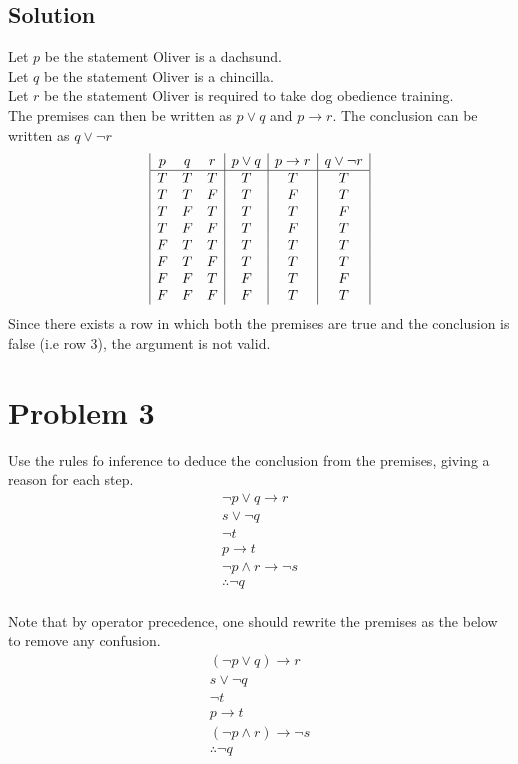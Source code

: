 \documentclass[table]{article}
\begin{document}
\subsection{Solution}
Let $p$ be the statement Oliver is a dachsund.\\
Let $q$ be the statement Oliver is a chincilla.\\
Let $r$ be the statement Oliver is required to take dog obedience training.\\
The premises can then be written as $p \lor q$ and $p \rightarrow r$. The conclusion can be written as $q \lor \neg r$
\begin{displaymath}
\begin{array}{|c c c|c|c|c|}
p & q & r & p \lor q & p \rightarrow r & q \lor \neg r\\
\hline
T & T & T & T & T & T\\
T & T & F & T & F & T\\
T & F & T & T & T & F\\
T & F & F & T & F & T\\
F & T & T & T & T & T\\
F & T & F & T & T & T\\
F & F & T & F & T & F\\
F & F & F & F & T & T\\
\end{array}
\end{displaymath}
Since there exists a row in which both the premises are true and the conclusion is false (i.e row 3), the argument is not valid.
\section{Problem 3}
Use the rules fo inference to deduce the conclusion from the premises, giving a reason for each step.
\begin{gather*}
\neg p \lor q \rightarrow r\\
s \lor \neg q\\
\neg t\\
p \rightarrow t\\
\neg p \land r \rightarrow \neg s\\
\therefore \neg q
\end{gather*}\\
Note that by operator precedence, one should rewrite the premises as the below to remove any confusion.
\begin{gather*}
(\neg p \lor q) \rightarrow r\\
s \lor \neg q\\
\neg t\\
p \rightarrow t\\
(\neg p \land r) \rightarrow \neg s\\
\therefore \neg q
\end{gather*}
\end{document}
